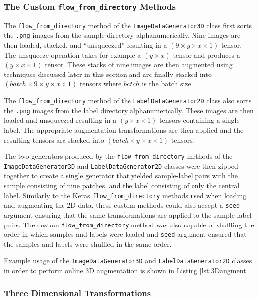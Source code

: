 \subsubsection{The Custom \texttt{flow\_from\_directory} Methods}

The \texttt{flow\_from\_directory} method of the \texttt{ImageDataGenerator3D} class first sorts the \texttt{.png} images from the sample directory alphanumerically. Nine images are then loaded, stacked, and ``unsqueezed'' resulting in a $(9 \times y \times x \times 1)$ tensor. The unsqueeze operation takes for example a $(y \times x)$ tensor and produces a $(y \times x \times 1)$ tensor. These stacks of nine images are then augmented using techniques discussed later in this section and are finally stacked into $(batch \times 9 \times y \times x \times 1)$ tensors where $batch$ is the batch size.

The \texttt{flow\_from\_directory} method of the \texttt{LabelDataGenerator2D} class also sorts the \texttt{.png} images from the label directory alphanumerically. These images are then loaded and unsqueezed resulting in a $(y \times x \times 1)$ tensors containing a single label. The appropriate augmentation transformations are then applied and the resulting tensors are stacked into $(batch \times y \times x \times 1)$ tensors.

The two generators produced by the \texttt{flow\_from\_directory} methods of the \texttt{ImageDataGenerator3D} and \texttt{LabelDataGenerator2D} classes were then zipped together to create a single generator that yielded sample-label pairs with the sample consisting of nine patches, and the label consisting of only the central label. Similarly to the Keras \texttt{flow\_from\_directory} methods used when loading and augmenting the 2D data, these custom methods could also accept a \texttt{seed} argument ensuring that the same transformations are applied to the sample-label pairs. The custom \texttt{flow\_from\_directory} method was also capable of shuffling the order in which samples and labels were loaded and \texttt{seed} argument ensured that the samples and labels were shuffled in the same order.

Example usage of the \texttt{ImageDataGenerator3D} and \texttt{LabelDataGenerator2D} classes in order to perform online 3D augmentation is shown in Listing \ref{lst:3Daugment}.

\subsubsection{Three Dimensional Transformations}
\label{sec:3daug}

